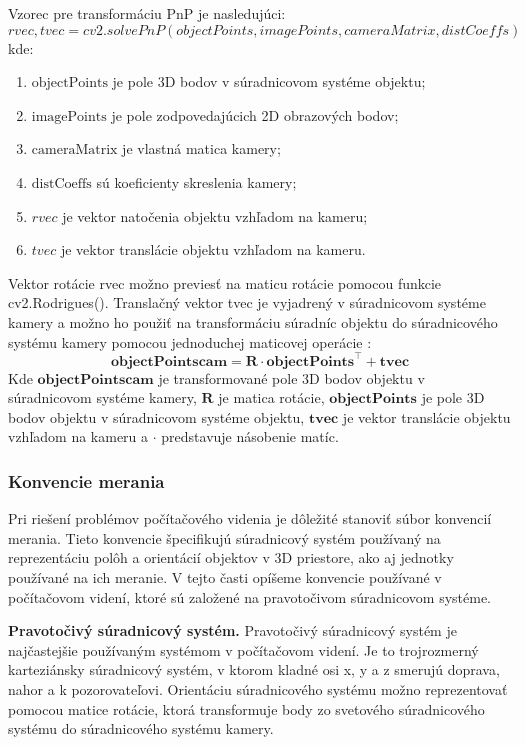 {Vzorec pre transformáciu PnP je nasledujúci:
\begin{equation}
    rvec, tvec = cv2.solvePnP(objectPoints, imagePoints, cameraMatrix, distCoeffs)
\end{equation}
kde:
\begin{enumerate}
\item $\text{objectPoints}$ je pole 3D bodov v súradnicovom systéme objektu;
\item $\text{imagePoints}$ je pole zodpovedajúcich 2D obrazových bodov;
\item $\text{cameraMatrix}$ je vlastná matica kamery;
\item $\text{distCoeffs}$ sú koeficienty skreslenia kamery;
\item $rvec$ je vektor natočenia objektu vzhľadom na kameru;
\item $tvec$ je vektor translácie objektu vzhľadom na kameru.
\end{enumerate}

Vektor rotácie rvec možno previesť na maticu rotácie pomocou funkcie cv2.Rodrigues(). Translačný vektor tvec je vyjadrený v súradnicovom systéme kamery a možno ho použiť na transformáciu súradníc objektu do súradnicového systému kamery pomocou jednoduchej maticovej operácie \citep{opencv_calib3d}:
\begin{equation}
    \textbf{objectPoints}{\textbf{cam}} = \textbf{R} \cdot \textbf{objectPoints}^{\top} + \textbf{t}{\textbf{vec}}
    \end{equation}
Kde $\textbf{objectPoints}{\textbf{cam}}$ je transformované pole 3D bodov objektu v súradnicovom systéme kamery, $\textbf{R}$ je matica rotácie, $\textbf{objectPoints}$ je pole 3D bodov objektu v súradnicovom systéme objektu, $\textbf{t}{\textbf{vec}}$ je vektor translácie objektu vzhľadom na kameru a $\cdot$ predstavuje násobenie matíc.

\subsubsection{Konvencie merania}
Pri riešení problémov počítačového videnia je dôležité stanoviť súbor konvencií merania. Tieto konvencie špecifikujú súradnicový systém používaný na reprezentáciu polôh a orientácií objektov v 3D priestore, ako aj jednotky používané na ich meranie. V tejto časti opíšeme konvencie používané v počítačovom videní, ktoré sú založené na pravotočivom súradnicovom systéme.

\textbf{Pravotočivý súradnicový systém.} Pravotočivý súradnicový systém je najčastejšie používaným systémom v počítačovom videní. Je to trojrozmerný karteziánsky súradnicový systém, v ktorom kladné osi x, y a z smerujú doprava, nahor a k pozorovateľovi. Orientáciu súradnicového systému možno reprezentovať pomocou matice rotácie, ktorá transformuje body zo svetového súradnicového systému do súradnicového systému kamery.

}
